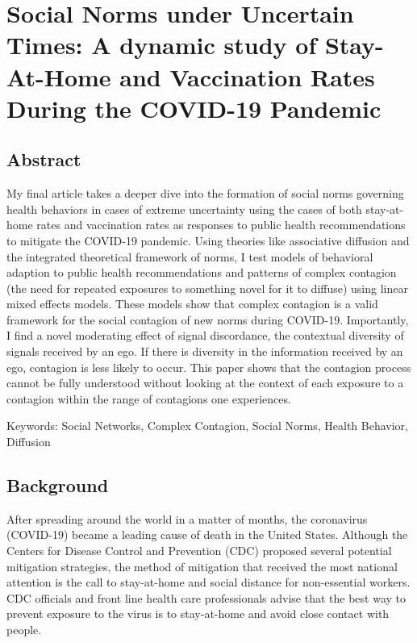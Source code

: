 \hypertarget{paper-3}{\chapter{Social Norms under Uncertain Times: A dynamic study of Stay-At-Home and Vaccination Rates During the COVID-19 Pandemic}\label{paper-3}}

\hypertarget{abstract-1}{\section{Abstract}\label{abstract-1}}

My final article takes a deeper dive into the formation of social norms
governing health behaviors in cases of extreme uncertainty using the cases of
both stay-at-home rates and vaccination rates as responses to public health
recommendations to mitigate the COVID-19 pandemic. Using theories like
associative diffusion and the integrated theoretical framework of norms, I test
models of behavioral adaption to public health recommendations and patterns of
complex contagion (the need for repeated exposures to something novel for it
to diffuse) using linear mixed effects models. These models show that complex
contagion is a valid framework for the social contagion of new norms during
COVID-19. Importantly, I find a novel moderating effect of signal discordance,
the contextual diversity of signals received by an ego. If there is diversity in
the information received by an ego, contagion is less likely to occur. This
paper shows that the contagion process cannot be fully understood without
looking at the context of each exposure to a contagion within the range of
contagions one experiences.

Keywords: Social Networks, Complex Contagion, Social Norms, Health Behavior, Diffusion

\hypertarget{background}{\section{Background}\label{background}}

After spreading around the world in a matter of months, the coronavirus
(COVID-19) became a leading cause of death in the United States. Although the
Centers for Disease Control and Prevention (CDC)
\citeyearpar{centersfordiseasecontrolandpreventionHowProtectYourself2020}
proposed several potential mitigation strategies, the method of mitigation that
received the most national attention is the call to stay-at-home and social
distance for non-essential workers. CDC officials and front line health care
professionals advise that the best way to prevent exposure to the virus is to
stay-at-home and avoid close contact with people.

